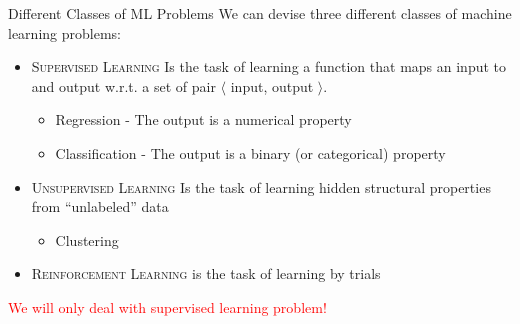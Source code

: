 \documentclass{beamer}
\begin{document}
\begin{frame}{Different Classes of ML Problems}
\large
We can devise three different classes of machine learning problems:
\begin{itemize}
\item \textsc{Supervised Learning}
Is the task of learning a function that maps an input to and output w.r.t. a set of
pair $\langle$ input, output $\rangle$.  

	\begin{itemize}
    	\item Regression - The output is a numerical property
        \item Classification - The output is a binary (or categorical) property
    \end{itemize}

\item \textsc{Unsupervised Learning} 
Is the task of learning hidden structural properties from ``unlabeled'' data

	\begin{itemize}
		\item Clustering 
	\end{itemize}
\item \textsc{Reinforcement Learning} is the task of learning by trials
\end{itemize}
\vskip 0.8cm
\huge
\textcolor{red}{We will only deal with supervised learning problem!}
\end{frame}
\end{document}
